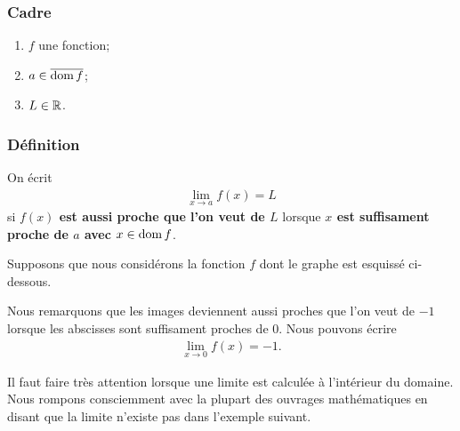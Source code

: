\documentclass[main.tex]{subfiles}
\begin{document}
\begin{definition}

    \subsubsection*{Cadre}
    \begin{enumerate}
        \item $f$ une fonction;
        \item $a \in \overline{\operatorname{dom} f}$;
        \item $L \in \mathbb{R}$.
    \end{enumerate}

    \subsubsection*{Définition}
    On écrit
    \begin{align}
        \lim_{x \to a} f(x) = L
    \end{align}
    si \textbf{$f(x)$ est aussi proche que l'on veut de $L$}
    lorsque \textbf{$x$ est suffisament proche de $a$ avec $x \in \operatorname{dom} f$}.
\end{definition}

\begin{example}

    Supposons que nous considérons la fonction $f$ dont le graphe est esquissé ci-dessous.

    \begin{center}
        \begin{plot}{0.5}{-6}{-6}{6}{6}
        \end{plot}
    \end{center}

    Nous remarquons que les images deviennent aussi proches que l'on veut de $-1$
    lorsque les abscisses sont suffisament proches de $0$.
    Nous pouvons écrire
    \begin{align}
        \lim_{x \to 0} f(x) = -1.
    \end{align}
\end{example}

Il faut faire très attention
lorsque une limite est calculée à l'intérieur du domaine.
Nous rompons consciemment avec la plupart des ouvrages mathématiques
en disant que la limite n'existe pas dans l'exemple suivant.
\end{document}
